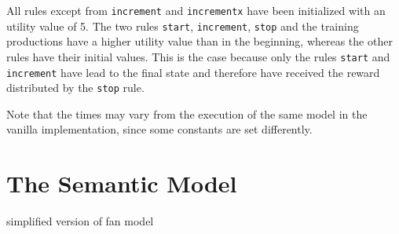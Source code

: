 All rules except from \lstinline|increment| and \lstinline|incrementx| have been initialized with an utility value of 5. The two rules \lstinline|start|, \lstinline|increment|, \lstinline|stop| and the training productions have a higher utility value than in the beginning, whereas the other rules have their initial values. This is the case because only the rules \lstinline|start| and \lstinline|increment| have lead to the final state and therefore have received the reward distributed by the \lstinline|stop| rule.

Note that the times may vary from the execution of the same model in the vanilla implementation, since some constants are set differently.


\section{The Semantic Model}


simplified version of fan model